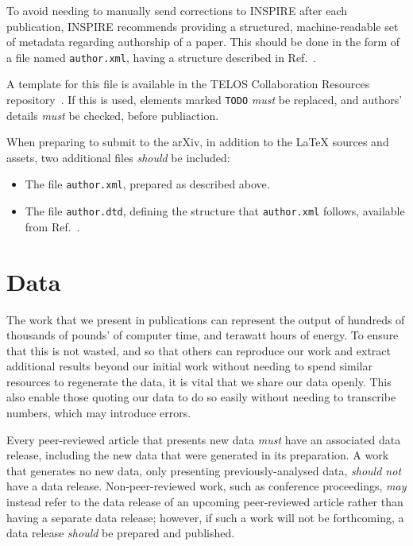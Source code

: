\documentclass{article}
\newcommand\rfcword[1]{\emph{#1}\xspace}
\newcommand\must{\rfcword{must}}
\newcommand\should{\rfcword{should}}
\newcommand\shouldnot{\rfcword{should not}}
\newcommand\may{\rfcword{may}}
\newcommand\filename[1]{\texttt{#1}\xspace}
\newcommand\authorxml{\filename{author.xml}\xspace}
\begin{document}
To avoid needing to manually send corrections to INSPIRE after each publication,
INSPIRE recommends providing
a structured, machine-readable set of metadata regarding authorship of a paper.
This should be done in the form of a file named \authorxml,
having a structure described in Ref.~\cite{inspire-authorxml}.

A template for this file is available in the TELOS Collaboration Resources repository~\cite{resources}.
If this is used,
elements marked \verb|TODO| \must be replaced,
and authors' details \must be checked,
before publiaction.

When preparing to submit to the arXiv,
in addition to the LaTeX sources and assets,
two additional files \should be included:

\begin{itemize}
  \item
        The file \authorxml,
        prepared as described above.
  \item
        The file \filename{author.dtd},
        defining the structure that \authorxml follows,
        available from Ref.~\cite{inspire-authorxml}.
\end{itemize}

\section{Data}\label{sec:data}

The work that we present in publications can represent
the output of hundreds of thousands of pounds' of computer time,
and terawatt hours of energy.
To ensure that this is not wasted,
and so that others can reproduce our work
and extract additional results beyond our initial work
without needing to spend similar resources to regenerate the data,
it is vital that we share our data openly.
This also enable those quoting our data to do so easily
without needing to transcribe numbers,
which may introduce errors.

Every peer-reviewed article that presents new data
\must have an associated data release,
including the new data that were generated in its preparation.
A work that generates no new data,
only presenting previously-analysed data,
\shouldnot have a data release.
Non-peer-reviewed work,
such as conference proceedings,
\may instead refer to
the data release of an upcoming peer-reviewed article
rather than having a separate data release;
however,
if such a work will not be forthcoming,
a data release \should be prepared and published.
\end{document}

